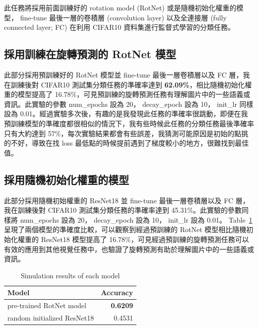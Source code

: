 \documentclass[a4paper,12pt]{article}   %
\begin{document}
	此任務將採用前面訓練好的 rotation model (RotNet) 或是隨機初始化權重的模型， fine-tune 最後一層的卷積層 (convolution layer) 以及全連接層 (fully connected layer; FC) 在利用 CIFAR10 資料集進行監督式學習的分類任務。


\subsection{採用訓練在旋轉預測的 RotNet 模型}
	此部分採用預訓練好的 RotNet 模型並 fine-tune 最後一層卷積層以及 FC 層，我在訓練後對 CIFAR10 測試集分類任務的準確率達到 \textbf{62.09\%}，相比隨機初始化權重的模型提高了 16.78\%，可見預訓練的旋轉預測任務有理解圖片中的一些語義或資訊。此實驗的參數 num\_epochs 設為 20， decay\_epoch 設為 10， init\_lr 同樣設為 0.01。經過實驗多次後，有趣的是我發現此任務的準確率很跳動，即便在我預訓練模型的準確度都很相似的情況下，我有些時候此任務的分類任務最後準確率只有大約達到 57\%，每次實驗結果都會有些誤差，我猜測可能原因是初始的點挑的不好，導致在找 loss 最低點的時候提前遇到了梯度較小的地方，很難找到最佳值。

	
\subsection{採用隨機初始化權重的模型}
	此部分採用隨機初始權重的 ResNet18 並 fine-tune 最後一層卷積層以及 FC 層，我在訓練後對 CIFAR10 測試集分類任務的準確率達到 45.31\%。此實驗的參數同樣將 num\_epochs 設為 20， decay\_epoch 設為 10， init\_lr 設為 0.01。 Table\ \ref{table:comparison1} 呈現了兩個模型的準確度比較，可以觀察到經過預訓練的 RotNet 模型相比隨機初始化權重的 ResNet18 模型提高了 16.78\%，可見經過預訓練的旋轉預測任務可以有效的應用到其他視覺任務中，也驗證了旋轉預測有助於理解圖片中的一些語義或資訊。
	
	
\begin{table}[htb]
	\centering	
	\normalsize
    \newcommand{\z}{\phantom{0}}
    \caption{Simulation results of each model}
    \vspace{0.15\baselineskip}
	\begin{tabularx}{0.6\textwidth}{@{}lr@{}}\toprule
		\textbf{Model} & \textbf{Accuracy} \\
		\hline
		pre-trained RotNet model & \textbf{0.6209}  \\ 
		random initialized ResNet18   & 0.4531  \\
    		\hline

	\end{tabularx}
	\label{table:comparison1}
   \vspace{0.15\baselineskip}
\end{table}
\end{document}
